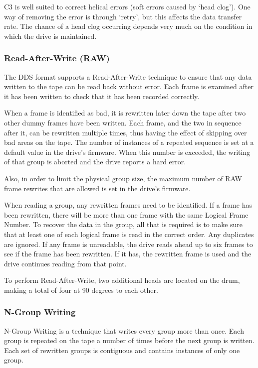 C3 is well suited to correct helical errors (soft errors caused by `head
clog'). One way of removing the error is through `retry', but this affects
the data transfer rate. The chance of a head clog occurring depends very
much on the condition in which the drive is maintained.

\subsubsection {Read-After-Write (RAW)}

The DDS format supports a Read-After-Write technique to ensure that any data
written to the tape can be read back without error. Each frame is examined
after it has been written to check that it has been recorded correctly.

When a frame is identified as bad, it is rewritten later down the tape
after two other dummy frames have been written. Each frame, and the two in
sequence after it, can be rewritten multiple times, thus having the effect
of skipping over bad areas on the tape. The number of instances of a
repeated sequence is set at a default value in the drive's firmware. When
this number is exceeded, the writing of that group is aborted and the drive
reports a hard error.

Also, in order to limit the physical group size, the maximum number of RAW
frame rewrites that are allowed is set in the drive's firmware.

When reading a group, any rewritten frames need to be identified. If a
frame has been rewritten, there will be more than one frame with the same
Logical Frame Number. To recover the data in the group, all that is required
is to make sure that at least one of each logical frame is read in the
correct order. Any duplicates are ignored. If any frame is unreadable, the
drive reads ahead up to six frames to see if the frame has been rewritten.
If it has, the rewritten frame is used and the drive continues reading from
that point.

To perform Read-After-Write, two additional heads are located on the drum,
making a total of four at 90 degrees to each other.

\subsubsection {N-Group Writing}

N-Group Writing is a technique that writes every group more than once. Each
group is repeated on the tape a number of times before the next group is
written. Each set of rewritten groups is contiguous and contains instances
of only one group.

